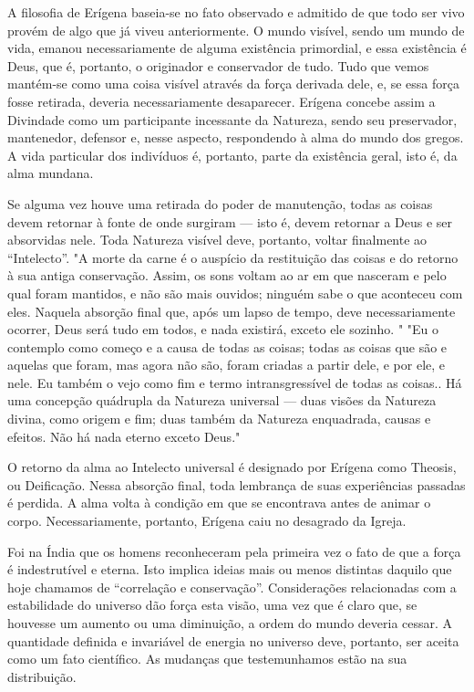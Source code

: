 \documentclass[11pt,a5paper,twoside,openany]{book}
\begin{document}
A filosofia de Erígena baseia-se no fato observado e admitido de que todo ser vivo provém de algo que já viveu anteriormente. O mundo visível, sendo um mundo de vida, emanou necessariamente de alguma existência primordial, e essa existência é Deus, que é, portanto, o originador e conservador de tudo. Tudo que vemos mantém-se como uma coisa visível através da força derivada dele, e, se essa força fosse retirada, deveria necessariamente desaparecer. Erígena concebe assim a Divindade como um participante incessante da Natureza, sendo seu preservador, mantenedor, defensor e, nesse aspecto, respondendo à alma do mundo dos gregos. A vida particular dos indivíduos é, portanto, parte da existência geral, isto é, da alma mundana.

Se alguma vez houve uma retirada do poder de manutenção, todas as coisas devem retornar à fonte de onde surgiram — isto é, devem retornar a Deus e ser absorvidas nele. Toda Natureza visível deve, portanto, voltar finalmente ao “Intelecto”. "A morte da carne é o auspício da restituição das coisas e do retorno à sua antiga conservação. Assim, os sons voltam ao ar em que nasceram e pelo qual foram mantidos, e não são mais ouvidos; ninguém sabe o que aconteceu com eles. Naquela absorção final que, após um lapso de tempo, deve necessariamente ocorrer, Deus será tudo em todos, e nada existirá, exceto ele sozinho. " "Eu o contemplo como começo e a causa de todas as coisas; todas as coisas que são e aquelas que foram, mas agora não são, foram criadas a partir dele, e por ele, e nele. Eu também o vejo como fim e termo intransgressível de todas as coisas.. Há uma concepção quádrupla da Natureza universal — duas visões da Natureza divina, como origem e fim; duas também da Natureza enquadrada, causas e efeitos. Não há nada eterno exceto Deus."

O retorno da alma ao Intelecto universal é designado por Erígena como Theosis, ou Deificação. Nessa absorção final, toda lembrança de suas experiências passadas é perdida. A alma volta à condição em que se encontrava antes de animar o corpo. Necessariamente, portanto, Erígena caiu no desagrado da Igreja.

Foi na Índia que os homens reconheceram pela primeira vez o fato de que a força é indestrutível e eterna. Isto implica ideias mais ou menos distintas daquilo que hoje chamamos de “correlação e conservação”. Considerações relacionadas com a estabilidade do universo dão força esta visão, uma vez que é claro que, se houvesse um aumento ou uma diminuição, a ordem do mundo deveria cessar. A quantidade definida e invariável de energia no universo deve, portanto, ser aceita como um fato científico. As mudanças que testemunhamos estão na sua distribuição.
\end{document}
